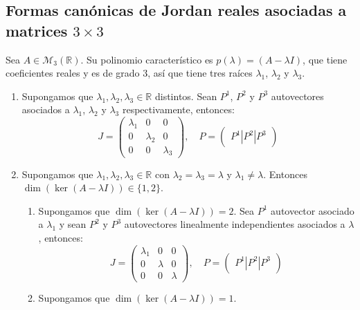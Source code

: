 \subsection*{Formas canónicas de Jordan reales asociadas a matrices $3 \times 3$}
Sea $A \in \mathcal{M}_3(\mathbb{R})$.
Su polinomio característico es $p(\lambda) = (A - \lambda I)$, que tiene coeficientes reales y es de grado 3, así que tiene tres raíces $\lambda_1$, $\lambda_2$ y $\lambda_3$.
\begin{enumerate}
    \item Supongamos que $\lambda_1, \lambda_2, \lambda_3 \in \mathbb{R}$ distintos.
          Sean $P^1$, $P^2$ y $P^3$ autovectores asociados a $\lambda_1$, $\lambda_2$ y $\lambda_3$ respectivamente, entonces:
          $$J = \begin{pmatrix}
                  \lambda_1 & 0         & 0         \\
                  0         & \lambda_2 & 0         \\
                  0         & 0         & \lambda_3
              \end{pmatrix}, \quad
              P = \begin{pmatrix}
                  P^1 | P^2 | P^3
              \end{pmatrix}$$
    \item Supongamos que $\lambda_1, \lambda_2, \lambda_3 \in \mathbb{R}$ con $\lambda_2 = \lambda_3 = \lambda$ y $\lambda_1 \neq \lambda$.
          Entonces $\dim(\ker(A - \lambda I)) \in \{1, 2\}$.
          \begin{enumerate}
              \item Supongamos que $\dim(\ker(A - \lambda I)) = 2$.
                    Sea $P^1$ autovector asociado a $\lambda_1$ y sean $P^2$ y $P^3$ autovectores linealmente independientes asociados a $\lambda$, entonces:
                    $$J = \begin{pmatrix}
                            \lambda_1 & 0       & 0       \\
                            0         & \lambda & 0       \\
                            0         & 0       & \lambda
                        \end{pmatrix}, \quad
                        P = \begin{pmatrix}
                            P^1 | P^2 | P^3
                        \end{pmatrix}$$
              \item Supongamos que $\dim(\ker(A - \lambda I)) = 1$.

\end{enumerate}
\end{enumerate}
